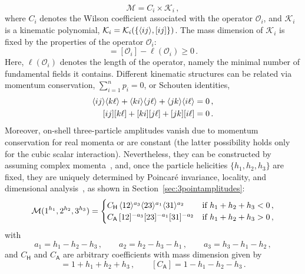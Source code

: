 \begin{equation}
    \mathcal M = C_i \times \mathcal K_i\,,
\end{equation}
where $C_i$ denotes the Wilson coefficient associated with the operator $\mathcal O_i$, and $\mathcal K_i$ is a kinematic polynomial, $\mathcal K_i = \mathcal K_i(\{\langle i j \rangle,\lbrack i j \rbrack\})$. The mass dimension of $\mathcal K_i$ is fixed by the properties of the operator $\mathcal O_i$:
\begin{equation}
    [\mathcal K_i] = [\mathcal O_i] - \ell(\mathcal O_i) \ge 0\,.
\end{equation}
Here, $\ell(\mathcal O_i)$ denotes the length of the operator, namely the minimal number of fundamental fields it contains.
Different kinematic structures can be related via momentum conservation, $\sum_{i=1}^n p_i = 0$, or Schouten identities,
\begin{align}
    \langle i j \rangle\langle k \ell \rangle + \langle k i \rangle\langle j \ell \rangle + \langle j k \rangle\langle i \ell \rangle &= 0\,,\label{eq:schhoutenid1}\\
    \lbrack i j \rbrack\lbrack k \ell \rbrack + \lbrack k i \rbrack\lbrack j \ell \rbrack + \lbrack j k \rbrack\lbrack i \ell \rbrack &= 0\label{eq:schhoutenid2}\,.
\end{align}
Moreover, on-shell three-particle amplitudes vanish due to momentum conservation for real momenta or are constant (the latter possibility holds only for the cubic scalar interaction).
Nevertheless, they can be constructed by assuming complex momenta~\cite{Witten:2003nn}, and, once the particle helicities $\{h_1,h_2,h_3\}$ are fixed, they are uniquely determined by Poincaré invariance, locality, and dimensional analysis~\cite{Benincasa:2007xk}, as shown in Section~\ref{sec:3pointamplitudes}:
\begin{equation}
    \mathcal M(1^{h_1},2^{h_2},3^{h_3}) = 
    \begin{cases}
        C_{\mathsf H}\, \langle 1 2 \rangle^{a_3} \langle 2 3 \rangle^{a_1} \langle 3 1 \rangle^{a_2} & \text{if }h_1+h_2+h_3<0\,,\\  C_{\mathsf A}\, \lbrack 1 2 \rbrack^{-a_3} \lbrack 2 3 \rbrack^{-a_1} \lbrack 3 1 \rbrack^{-a_2} & \text{if }h_1+h_2+h_3>0\,,
    \end{cases}
\end{equation}
with
\begin{equation}
    a_1 = h_1-h_2-h_3\,,\qquad
    a_2 = h_2-h_3-h_1\,,\qquad
    a_3 = h_3-h_1-h_2\,,
\end{equation}
and $C_{\mathsf H}$ and $C_{\mathsf A}$ are arbitrary coefficients with mass dimension given by
\begin{equation}
    [C_{\mathsf H}] = 1+h_1+h_2+h_3\,,\qquad 
    [C_{\mathsf A}] = 1-h_1-h_2-h_3\,.
\end{equation}

